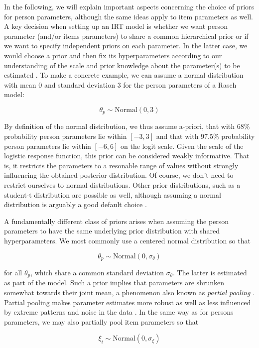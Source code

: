 \documentclass[jss]{jss}
\begin{document}
In the following, we will explain important aspects concerning the
choice of priors for person parameters, although the same ideas apply to
item parameters as well. A key decision when setting up an IRT model is
whether we want person parameter (and/or items parameters) to share a
common hierarchical prior or if we want to specify independent priors on
each parameter. In the latter case, we would choose a prior and then fix
its hyperparameters according to our understanding of the scale and
prior knowledge about the parameter(s) to be estimated
\citep{gelman2014}. To make a concrete example, we can assume a normal
distribution with mean \(0\) and standard deviation \(3\) for the person
parameters of a Rasch model:

\[
\theta_p \sim \text{Normal}(0, 3)
\]

By definition of the normal distribution, we thus assume a-priori, that
with \(68\%\) probability person parameters lie within \([-3, 3]\) and
that with \(97.5\%\) probability person parameters lie within
\([-6, 6]\) on the logit scale. Given the scale of the logistic response
function, this prior can be considered weakly informative. That is, it
restricts the parameters to a resonable range of values without strongly
influencing the obtained posterior distribution. Of course, we don't
need to restrict ourselves to normal distributions. Other prior
distributions, such as a student-t distribution are possible as well,
although assuming a normal distribution is arguably a good default
choice \citep[see also][]{mcelreath2017}.

A fundamentally different class of priors arises when assuming the
person parameters to have the same underlying prior distribution with
shared hyperparameters. We most commonly use a centered normal
distribution so that

\[
\theta_p \sim \text{Normal}(0, \sigma_\theta)
\]

for all \(\theta_p\), which share a common standard deviation
\(\sigma_\theta\). The latter is estimated as part of the model. Such a
prior implies that parameters are shrunken somewhat towards their joint
mean, a phenomenon also known as \emph{partial pooling}
\citep{gelmanMLM2006}. Partial pooling makes parameter estimates more
robust as well as less influenced by extreme patterns and noise in the
data \citep{gelmanMLM2006}. In the same way as for persons parameters,
we may also partially pool item parameters so that

\[
\xi_i \sim \text{Normal}(0, \sigma_\xi)
\]
\end{document}
